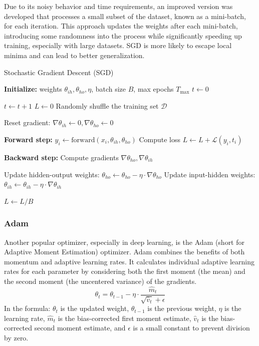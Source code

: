 Due to its noisy behavior and time requirements, an improved version was developed that processes a small subset of the dataset, known as a mini-batch, for each iteration. This approach updates the weights after each mini-batch, introducing some randomness into the process while significantly speeding up training, especially with large datasets. SGD is more likely to escape local minima and can lead to better generalization.
\begin{algorithm}[H]
\caption{Stochastic Gradient Descent (SGD)}
\begin{algorithmic}[1]
\State \textbf{Initialize:} weights $\theta_{ih}, \theta_{ho}, \eta$, batch size $B$, max epochs $T_{\text{max}}$
\State $t \gets 0$

\Repeat
    \State $t \gets t + 1$
    \State $L \gets 0$ 
    \State Randomly shuffle the training set $\mathcal{D}$

        \State Reset gradient: $\nabla \theta_{ih} \gets 0, \nabla \theta_{ho} \gets 0$
        
            \State \textbf{Forward step:} $y_i \gets \text{forward}(x_i, \theta_{ih}, \theta_{ho})$
            \State Compute loss $L \gets L + \mathcal{L}(y_i, t_i)$
            
            \State \textbf{Backward step:} Compute gradients $\nabla \theta_{ho}, \nabla \theta_{ih}$ 
        \EndFor

        \State Update hidden-output weights: $\theta_{ho} \gets \theta_{ho} - \eta \cdot \nabla \theta_{ho}$
        \State Update input-hidden weights: $\theta_{ih} \gets \theta_{ih} - \eta \cdot \nabla \theta_{ih}$
        
        \State $L \gets L / B$ 
    \EndFor
    

\end{algorithmic}
\end{algorithm}

\subsubsection*{Adam}
Another popular optimizer, especially in deep learning, is the Adam (short for Adaptive Moment Estimation) optimizer. Adam combines the benefits of both momentum and adaptive learning rates. It calculates individual adaptive learning rates for each parameter by considering both the first moment (the mean) and the second moment (the uncentered variance) of the gradients.
\begin{equation}
    \theta_t = \theta_{t-1} - \eta \cdot \frac{\hat{m}_t}{\sqrt{\hat{v}_t} + \epsilon}
\end{equation}
In the formula: \(\theta_t\) is the updated weight, \(\theta_{t-1}\) is the previous weight, \(\eta\) is the learning rate, \(\hat{m}_t\) is the bias-corrected first moment estimate, \(\hat{v}_t\) is the bias-corrected second moment estimate, and \(\epsilon\) is a small constant to prevent division by zero.

